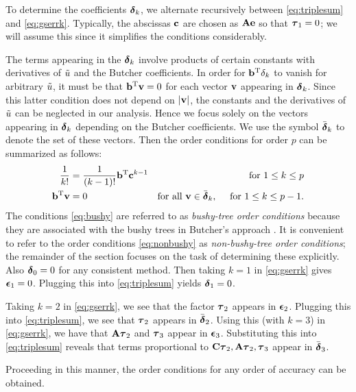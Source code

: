 To determine the coefficients $\boldsymbol{\delta}_k$, we alternate recursively 
between \eqref{eq:triplesum} and \eqref{eq:gserrk}.
Typically, the abscissas $\mathbf{c}$ are chosen as $\mathbf{A}\mathbf{e}$ so that $\boldsymbol{\tau}_1=0$; 
we will assume this since it simplifies the conditions considerably.

The terms appearing in the $\boldsymbol{\delta}_k$ involve products of certain constants
with derivatives of $\tilde{u}$ and the Butcher coefficients.  In order for $\mathbf{b}^\mathrm{T} \delta_k$
to vanish for arbitrary $\tilde{u}$, it must be that $\mathbf{b}^\mathrm{T} \mathbf{v} = 0$ for each vector $\mathbf{v}$
appearing in $\boldsymbol{\delta}_k$.  Since this latter condition does not depend on $|\mathbf{v}|$,
the constants and the derivatives of $\tilde{u}$ can be neglected in our analysis.
Hence we focus solely on the vectors appearing in $\boldsymbol{\delta}_k$ depending on the 
Butcher coefficients.  We use the symbol $\bar{\boldsymbol{\delta}}_k$ to denote the set of these vectors.
Then the order conditions for order $p$ can be summarized as follows:
\begin{subequations}
\begin{align}\label{eq:bushy}
\frac{1}{k!} & = \frac{1}{(k-1)!}\bb\transpose \bc^{k-1} 
            & \mbox{for } 1\le k\le p \\
\bb\transpose\bv & = 0 & \mbox{for all } \bv\in\deltaset_k, \ \ \ \ \mbox{for } 1\le k\le p-1.
\label{eq:nonbushy}
\end{align}
\end{subequations}
The conditions \eqref{eq:bushy} are referred to as {\em bushy-tree order conditions}
because they are associated with the bushy trees in Butcher's approach \cite{butcher2003}.
It is convenient to refer to the order conditions \eqref{eq:nonbushy} as {\em non-bushy-tree
order conditions}; the remainder of the section focuses on the task of determining these
explicitly.
Also $\boldsymbol{\delta}_0=0$ for any consistent method. Then taking $k=1$
in \eqref{eq:gserrk} gives $\boldsymbol{\epsilon}_1=0$.  Plugging this into \eqref{eq:triplesum}
yields $\boldsymbol{\delta}_1=0$.

Taking $k=2$ in \eqref{eq:gserrk}, we see that the factor $\boldsymbol{\tau}_2$ appears in $\boldsymbol{\epsilon}_2$.
Plugging this into \eqref{eq:triplesum}, we see that $\boldsymbol{\tau}_2$ appears in $\bar{\boldsymbol{\delta}}_2$.
Using this (with $k=3$) in \eqref{eq:gserrk}, we have that $\mathbf{A}\boldsymbol{\tau}_2$ and $\boldsymbol{\tau}_3$
appear in $\boldsymbol{\epsilon}_3$.  Substituting this into \eqref{eq:triplesum} reveals that terms
proportional to $\mathbf{C}\boldsymbol{\tau}_2, \mathbf{A}\boldsymbol{\tau}_2, \boldsymbol{\tau}_3$ appear in $\bar{\boldsymbol{\delta}}_3$.

Proceeding in this manner, the order conditions for any order of accuracy can be obtained.



